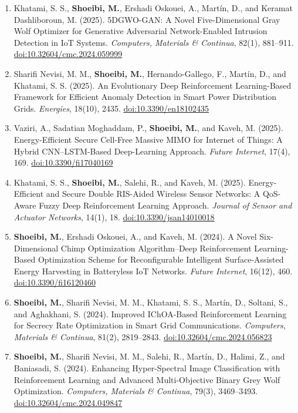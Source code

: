 \documentclass[10pt,letterpaper]{article}
\newcommand{\me}{\textbf{Shoeibi, M.}}
\begin{document}
\begin{enumerate}[resume]
  \item Khatami, S. S., \me{}, Ershadi Oskouei, A., Mart\'in, D., and Keramat Dashliboroun, M. (2025). 5DGWO-GAN: A Novel Five-Dimensional Gray Wolf Optimizer for Generative Adversarial Network-Enabled Intrusion Detection in IoT Systems. \emph{Computers, Materials \& Continua}, 82(1), 881--911. \href{https://doi.org/10.32604/cmc.2024.059999}{doi:10.32604/cmc.2024.059999}
  \item Sharifi Nevisi, M. M., \me{}, Hernando-Gallego, F., Mart\'in, D., and Khatami, S. S. (2025). An Evolutionary Deep Reinforcement Learning-Based Framework for Efficient Anomaly Detection in Smart Power Distribution Grids. \emph{Energies}, 18(10), 2435. \href{https://doi.org/10.3390/en18102435}{doi:10.3390/en18102435}
  \item Vaziri, A., Sadatian Moghaddam, P., \me{}, and Kaveh, M. (2025). Energy-Efficient Secure Cell-Free Massive MIMO for Internet of Things: A Hybrid CNN--LSTM-Based Deep-Learning Approach. \emph{Future Internet}, 17(4), 169. \href{https://doi.org/10.3390/fi17040169}{doi:10.3390/fi17040169}
  \item Khatami, S. S., \me{}, Salehi, R., and Kaveh, M. (2025). Energy-Efficient and Secure Double RIS-Aided Wireless Sensor Networks: A QoS-Aware Fuzzy Deep Reinforcement Learning Approach. \emph{Journal of Sensor and Actuator Networks}, 14(1), 18. \href{https://doi.org/10.3390/jsan14010018}{doi:10.3390/jsan14010018}
  \item \me{}, Ershadi Oskouei, A., and Kaveh, M. (2024). A Novel Six-Dimensional Chimp Optimization Algorithm--Deep Reinforcement Learning-Based Optimization Scheme for Reconfigurable Intelligent Surface-Assisted Energy Harvesting in Batteryless IoT Networks. \emph{Future Internet}, 16(12), 460. \href{https://doi.org/10.3390/fi16120460}{doi:10.3390/fi16120460}
  \item \me{}, Sharifi Nevisi, M. M., Khatami, S. S., Mart\'in, D., Soltani, S., and Aghakhani, S. (2024). Improved IChOA-Based Reinforcement Learning for Secrecy Rate Optimization in Smart Grid Communications. \emph{Computers, Materials \& Continua}, 81(2), 2819--2843. \href{https://doi.org/10.32604/cmc.2024.056823}{doi:10.32604/cmc.2024.056823}
  \item \me{}, Sharifi Nevisi, M. M., Salehi, R., Mart\'in, D., Halimi, Z., and Baniasadi, S. (2024). Enhancing Hyper-Spectral Image Classification with Reinforcement Learning and Advanced Multi-Objective Binary Grey Wolf Optimization. \emph{Computers, Materials \& Continua}, 79(3), 3469--3493. \href{https://doi.org/10.32604/cmc.2024.049847}{doi:10.32604/cmc.2024.049847}
\end{enumerate}
\endgroup
\end{document}
